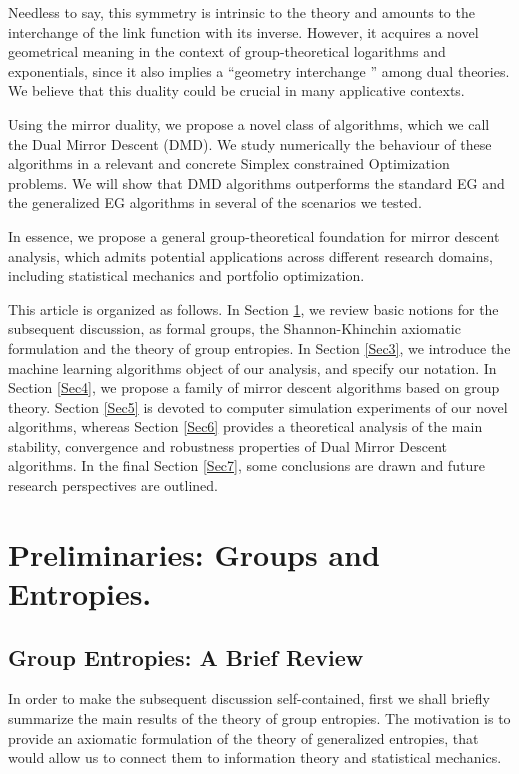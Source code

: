 \documentclass[10pt]{amsart}
\theoremstyle{definition}
\theoremstyle{definition}	 %
\begin{document}
\vspace{2mm}

Needless to say, this symmetry is intrinsic to the theory and amounts to the interchange of the link function with its inverse. However, it acquires a novel geometrical meaning in the context of group-theoretical logarithms and exponentials, since it also implies a ``geometry interchange '' among dual theories. We believe that this duality could be crucial in many applicative contexts.



Using the mirror duality, we propose a novel class of algorithms, which we call the Dual Mirror Descent (DMD). We study numerically the behaviour of these algorithms in a relevant and concrete  Simplex constrained Optimization problems. We will show that DMD algorithms outperforms the standard EG and the generalized EG algorithms in several of the scenarios we tested.

In essence, we propose a general group-theoretical foundation for mirror descent analysis, which admits potential applications across different research domains, including statistical mechanics and portfolio optimization.

This article is organized as follows. In Section \ref{Sec2}, we review basic notions for the subsequent discussion, as formal groups, the Shannon-Khinchin axiomatic formulation and the theory of group entropies. In Section \ref{Sec3}, we introduce the machine learning algorithms object of our analysis, and specify our notation. In Section \ref{Sec4}, we propose a  family of mirror descent algorithms based on group theory.   Section \ref{Sec5} is devoted to computer simulation experiments of our novel algorithms, whereas Section \ref{Sec6} provides  a theoretical analysis of the main stability,  convergence and robustness properties of Dual Mirror Descent algorithms. In the final Section \ref{Sec7}, some conclusions are drawn and future research perspectives are outlined.

\section{Preliminaries: Groups and Entropies.} \label{Sec2}

\subsection{Group Entropies: A Brief Review}

In order to make the subsequent discussion self-contained, first we shall briefly summarize the main results of the theory of group entropies. The motivation is to provide an axiomatic formulation
of the theory of generalized entropies, that would allow us to connect them to information theory and statistical mechanics.
\end{document}
